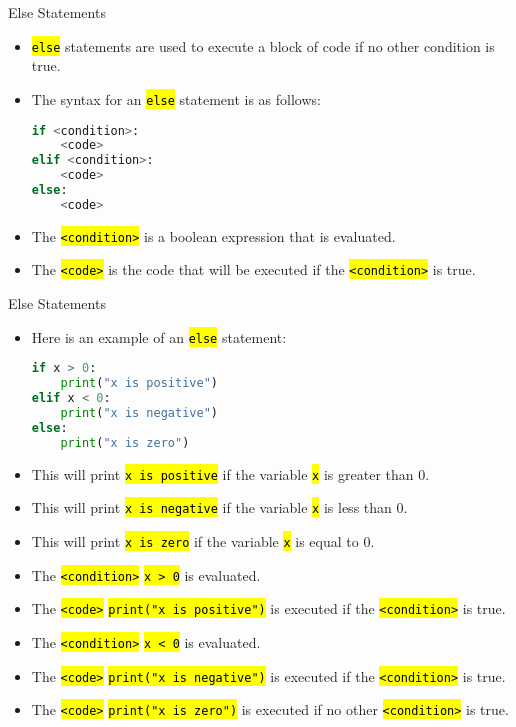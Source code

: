\documentclass[
    aspectratio=169, 
    usepdftitle=false, 
    xcolor={dvipsnames},
    hyperref={
        colorlinks,
        linkcolor=black,
        urlcolor=blue}
    ]{beamer}
\let\OldTexttt\texttt
\renewcommand{\texttt}[1]{\OldTexttt{\hl{#1}}}%
\begin{document}
\begin{frame}[fragile]{Else Statements}
    \begin{itemize}
        \item \texttt{else} statements are used to execute a block of code if no other condition is true.
        \item The syntax for an \texttt{else} statement is as follows:
        \begin{lstlisting}[language=Python]
if <condition>:
    <code>
elif <condition>:
    <code>
else:
    <code>
        \end{lstlisting}
        \item The \texttt{<condition>} is a boolean expression that is evaluated.
        \item The \texttt{<code>} is the code that will be executed if the \texttt{<condition>} is true.
    \end{itemize}   
\end{frame}

\begin{frame}[fragile]{Else Statements}
    \begin{itemize}
        \item Here is an example of an \texttt{else} statement:
        \begin{lstlisting}[language=Python]
if x > 0:
    print("x is positive")
elif x < 0:
    print("x is negative")
else:
    print("x is zero")
        \end{lstlisting}
        \item This will print \texttt{x is positive} if the variable \texttt{x} is greater than 0.
        \item This will print \texttt{x is negative} if the variable \texttt{x} is less than 0.
        \item This will print \texttt{x is zero} if the variable \texttt{x} is equal to 0.
        \item The \texttt{<condition>} \texttt{x > 0} is evaluated.
        \item The \texttt{<code>} \texttt{print("x is positive")} is executed if the \texttt{<condition>} is true.
        \item The \texttt{<condition>} \texttt{x < 0} is evaluated.
        \item The \texttt{<code>} \texttt{print("x is negative")} is executed if the \texttt{<condition>} is true.
        \item The \texttt{<code>} \texttt{print("x is zero")} is executed if no other \texttt{<condition>} is true.
    \end{itemize}
\end{frame}
\end{document}
